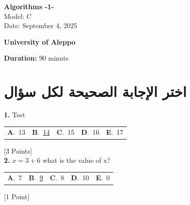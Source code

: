 \documentclass[12pt]{article}
\newcommand{\choice}[2]{\textbf{#1}.~#2}
\begin{document}
\begin{flushright}
{\Large \textbf{{\textenglish{Algorithms -1-}}}}\\[0.25em]
{\normalsize \textenglish{Model: }{\textenglish{C}}}\\[0.1em]
{\normalsize \textenglish{Date: }{\textenglish{September 4, 2025}}}
\end{flushright}

\vspace{0.6cm}

\noindent
\begin{minipage}[t]{0.65\textwidth}
  \raggedright
  \textbf{{\textenglish{University of Aleppo}}}\\[0.3em]
\end{minipage}\hfill
\begin{minipage}[t]{0.3\textwidth}
  \raggedleft
  \textenglish{\textbf{Duration: }}{\textenglish{90 minuts}}
\end{minipage}

\vspace{0.9cm}

\section*{اختر الإجابة الصحيحة لكل سؤال}

\noindent \textbf{\textenglish{1.}} {\textenglish{Test}}

\begin{tabularx}{\linewidth}{@{}*{5}{Y}@{}}
\choice{A}{{{\textenglish{13}}}} & \choice{B}{{\underline{{\textenglish{14}}}}} & \choice{C}{{{\textenglish{15}}}} & \choice{D}{{{\textenglish{16}}}} & \choice{E}{{{\textenglish{17}}}} \\
\end{tabularx}
\hfill {\textenglish{[3 Points]}}\\[0.5em]

\noindent \textbf{\textenglish{2.}} \(x=3+6 \){\textenglish{ what is the value of x?}}

\begin{tabularx}{\linewidth}{@{}*{5}{Y}@{}}
\choice{A}{{{\textenglish{7}}}} & \choice{B}{{\underline{{\textenglish{9}}}}} & \choice{C}{{{\textenglish{8}}}} & \choice{D}{{{\textenglish{10}}}} & \choice{E}{{{\textenglish{0}}}} \\
\end{tabularx}
\hfill {\textenglish{[1 Point]}}\\[0.5em]
\end{document}
